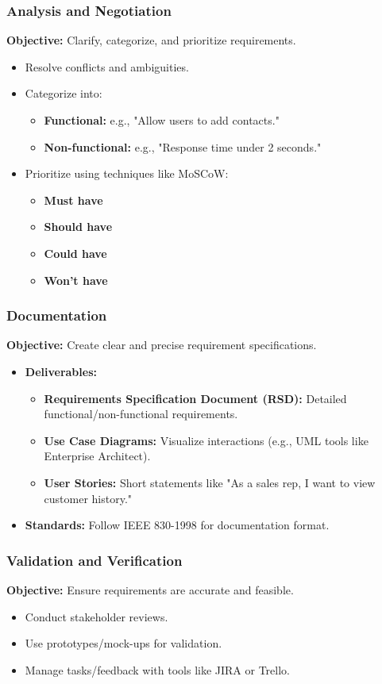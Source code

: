 \documentclass{beamer}
\begin{document}
\begin{frame}[fragile]
  \frametitle{Analysis and Negotiation}
  \textbf{Objective:} Clarify, categorize, and prioritize requirements.
  \begin{itemize}
    \item Resolve conflicts and ambiguities.
    \item Categorize into:
    \begin{itemize}
      \item \textbf{Functional:} e.g., "Allow users to add contacts."
      \item \textbf{Non-functional:} e.g., "Response time under 2 seconds."
    \end{itemize}
    \item Prioritize using techniques like MoSCoW:
    \begin{itemize}
      \item \textbf{Must have}
      \item \textbf{Should have}
      \item \textbf{Could have}
      \item \textbf{Won't have}
    \end{itemize}
  \end{itemize}
\end{frame}

\begin{frame}[fragile]
  \frametitle{Documentation}
  \textbf{Objective:} Create clear and precise requirement specifications.
  \begin{itemize}
    \item \textbf{Deliverables:}
    \begin{itemize}
      \item \textbf{Requirements Specification Document (RSD):} Detailed functional/non-functional requirements.
      \item \textbf{Use Case Diagrams:} Visualize interactions (e.g., UML tools like Enterprise Architect).
      \item \textbf{User Stories:} Short statements like "As a sales rep, I want to view customer history."
    \end{itemize}
    \item \textbf{Standards:} Follow IEEE 830-1998 for documentation format.
  \end{itemize}
\end{frame}

\begin{frame}[fragile]
  \frametitle{Validation and Verification}
  \textbf{Objective:} Ensure requirements are accurate and feasible.
  \begin{itemize}
    \item Conduct stakeholder reviews.
    \item Use prototypes/mock-ups for validation.
    \item Manage tasks/feedback with tools like JIRA or Trello.
  \end{itemize}
\end{frame}
\end{document}

